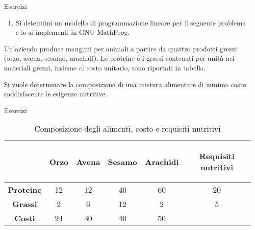 \documentclass{beamer}
\begin{document}
\generatitolo
\begin{frame}%
{Esercizi}

\begin{enumerate}
\item
  Si determini un modello di programmazione lineare per
  il seguente problema e lo si implementi in GNU MathProg.
\end{enumerate}

\begin{block}{}
Un'azienda produce mangimi per animali a partire da quattro prodotti grezzi (orzo, avena, sesamo, arachidi). Le proteine e i grassi contenuti per unità nei materiali grezzi, insieme al costo unitario, sono riportati in tabella.%

Si vuole determinare la composizione di una mistura alimentare di minimo costo soddisfacente le esigenze nutritive. 
\end{block}
\end{frame}

\begin{frame}%
{Esercizi}

\begin{table}
\begin{tabular}{c|cccc|c}\toprule
&\bf Orzo&\bf Avena&\bf Sesamo&\bf Arachidi&\parbox{1.5cm}{{\bf \begin{center}Requisiti nutritivi\end{center}}}\\\midrule
\bf Proteine & 12& 12 & 40 & 60 & 20 \\
\bf Grassi   &  2&  6 & 12 &  2 &  5 \\\midrule
\bf Costi    & 24& 30 & 40 & 50 &    \\\bottomrule
\end{tabular}
\caption{Composizione degli alimenti, costo e requisiti nutritivi}
\label{tab:istanza}
\end{table}

\end{frame}
\end{document}
